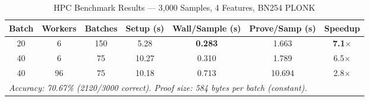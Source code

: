 \begin{table}[H]
\centering
\caption{HPC Benchmark Results — 3,000 Samples, 4 Features, BN254 PLONK}
\label{tab:hpc_benchmark}
\begin{tabular}{|c|c|c|c|c|c|c|}
\hline
\textbf{Batch} & \textbf{Workers} & \textbf{Batches} & \textbf{Setup (s)} & \textbf{Wall/Sample (s)} & \textbf{Prove/Samp (s)} & \textbf{Speedup} \\
\hline
20 & 6  & 150 & 5.28  & \textbf{0.283} & 1.663  & \textbf{7.1$\times$} \\
40 & 6  & 75  & 10.27 & 0.310 & 1.789  & 6.5$\times$ \\
40 & 96 & 75  & 10.18 & 0.713 & 10.694 & 2.8$\times$ \\
\hline
\multicolumn{7}{|l|}{\textit{Accuracy: 70.67\% (2120/3000 correct). Proof size: 584 bytes per batch (constant).}} \\
\hline
\end{tabular}
\end{table}

